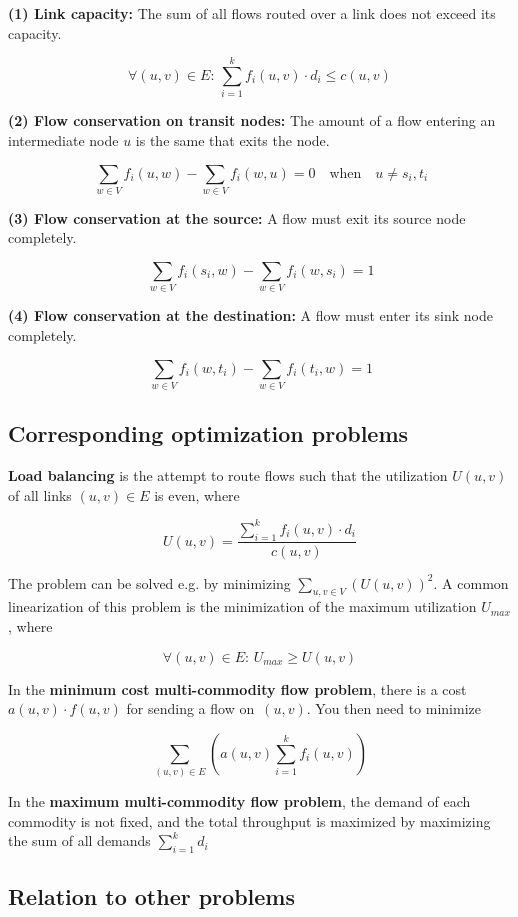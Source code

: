 {\textbf{(1) Link capacity:} The sum of all flows routed over a link does
not exceed its capacity.

\[\forall (u,v)\in E:\,\sum_{i=1}^{k} f_i(u,v)\cdot d_i \leq c(u,v)\]

\textbf{(2) Flow conservation on transit nodes:} The amount of a flow
entering an intermediate node \(u\) is the same that exits the node.

\[\,\sum_{w \in V} f_i(u,w) - \sum_{w \in V} f_i(w,u) = 0 \quad \mathrm{when} \quad u \neq s_i, t_i\]

\textbf{(3) Flow conservation at the source:} A flow must exit its
source node completely.

\[\,\sum_{w \in V} f_i(s_i,w) - \sum_{w \in V} f_i(w,s_i) = 1\]

\textbf{(4) Flow conservation at the destination:} A flow must enter its
sink node completely.

\[\,\sum_{w \in V} f_i(w,t_i) - \sum_{w \in V} f_i(t_i,w) = 1\]

\hypertarget{corresponding-optimization-problems}{%
\subsection{Corresponding optimization
problems}\label{corresponding-optimization-problems}}

\textbf{Load balancing} is the attempt to route flows such that the
utilization \(U(u,v)\) of all links \((u,v)\in E\) is even, where

\[U(u,v)=\frac{\sum_{i=1}^{k} f_i(u,v)\cdot d_i}{c(u,v)}\]

The problem can be solved e.g. by minimizing
\(\sum_{u,v\in V} (U(u,v))^2\). A common linearization of this problem
is the minimization of the maximum utilization \(U_{max}\), where

\[\forall (u,v)\in E:\, U_{max} \geq U(u,v)\]

In the \textbf{minimum cost multi-commodity flow problem}, there is a
cost \(a(u,v) \cdot f(u,v)\) for sending a flow on \(\,(u,v)\). You then
need to minimize

\[\sum_{(u,v) \in E} \left( a(u,v) \sum_{i=1}^{k} f_i(u,v) \right)\]

In the \textbf{maximum multi-commodity flow problem}, the demand of each
commodity is not fixed, and the total throughput is maximized by
maximizing the sum of all demands \(\sum_{i=1}^{k} d_i\)

\hypertarget{relation-to-other-problems}{%
\subsection{Relation to other
problems}\label{relation-to-other-problems}}

}
